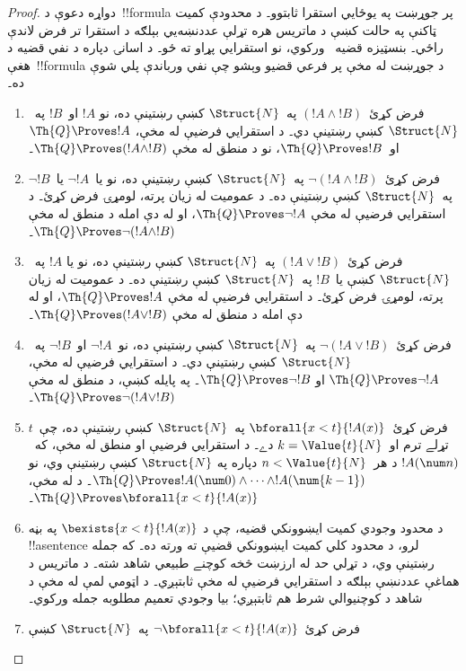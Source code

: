 \documentclass[../../../include/open-logic-section]{subfiles}
\begin{document}
\begin{proof}
دواړه دعوې د~!!{formula} پر جوړښت په يوځايي استقرا ثابتوو۔ د محدودې کمیت ټاکنې په حالت کښې د ماتريس هره تړلې عددنښه‌يي بېلګه د استقرا تر فرض لاندې راځي۔
%
بنسټيزه قضيه~ ورکوي، نو استقرايي
پړاو ته ځو۔ د اسانۍ دپاره د نفي قضيه د هغې~!!{formula} د جوړښت له
مخې پر فرعي قضيو وېشو چې نفي ورباندې پلي شوې ده۔

\begin{enumerate}
\item فرض کړئ~$(!A \land !B)$ په~$\Struct{N}$ کښې رښتينې ده، نو
$!A$ او~$!B$ په~$\Struct{N}$ کښې رښتينې دي۔ د استقرايي فرضيې له
مخې، $\Th{Q} \Proves !A$ او~$\Th{Q} \Proves !B$، نو د منطق له مخې
$\Th{Q} \Proves (!A \land !B)$۔
%
\item فرض کړئ~$\lnot (!A \land !B)$ په~$\Struct{N}$ کښې رښتينې ده،
نو يا~$\lnot !A$ يا~$\lnot !B$ په~$\Struct{N}$ کښې رښتينې ده۔ د
عموميت له زيان پرته، لومړۍ فرض کړئ۔ د استقرايي فرضيې له مخې
$\Th{Q} \Proves \lnot !A$، او له دې امله د منطق له مخې
$\Th{Q} \Proves \lnot (!A \land !B)$۔
%
\item فرض کړئ~$(!A \lor !B)$ په~$\Struct{N}$ کښې رښتينې ده، نو يا
$!A$ په~$\Struct{N}$ کښې يا~$!B$ په~$\Struct{N}$ کښې رښتينې ده۔ د عموميت له زيان
پرته، لومړۍ فرض کړئ۔ د استقرايي فرضيې له مخې
$\Th{Q} \Proves !A$، او له دې امله د منطق له مخې
$\Th{Q} \Proves (!A \lor !B)$۔
%
\item فرض کړئ~$\lnot(!A \lor !B)$ په~$\Struct{N}$ کښې رښتينې ده،
نو~$\lnot !A$ او~$\lnot !B$ په~$\Struct{N}$ کښې رښتينې دي۔ د
استقرايي فرضيې له مخې، $\Th{Q} \Proves \lnot !A$ او
$\Th{Q} \Proves \lnot !B$۔ په پايله کښې، د منطق له مخې
$\Th{Q} \Proves \lnot(!A \lor !B)$۔
%
\item فرض کړئ~$\bforall{x<t}{!A(x)}$ په~$\Struct{N}$ کښې رښتينې
ده، چې~$t$ تړلے ترم او~$k=\Value{t}{N}$ دے۔ د استقرايي فرضيې او
منطق له مخې، که~$!A(\num n)$ د هر~$n < \Value{t}{N}$ دپاره په
$\Struct{N}$ کښې رښتينې وي، نو
$\Th{Q} \Proves !A(\num 0) \land \dots \land !A(\num{k-1})$۔ د
 له مخې،
$\Th{Q} \Proves \bforall{x<t}{!A(x)}$۔
%
\item د محدود وجودي کمیت ايښوونکي قضيه، چې د
$\bexists{x < t}{!A(x)}$ په بڼه !!a{sentence} لرو، د محدود کلي
کمیت ايښوونکي قضيې ته ورته ده۔ که جمله رښتينې وي، د تړلي حد له ارزښت څخه کوچنے طبيعي شاهد شته۔ د ماتريس د هماغې عددنښې بېلګه د استقرايي فرضيې له مخې ثابتېږي۔ د اټومي لمې له مخې د شاهد د کوچنيوالي شرط هم ثابتېږي؛ بيا وجودي تعميم مطلوبه جمله ورکوي۔
%
\item فرض کړئ~$\lnot \bforall{x<t}{!A(x)}$ په~$\Struct{N}$ کښې

\end{enumerate}
\end{proof}
\end{document}

